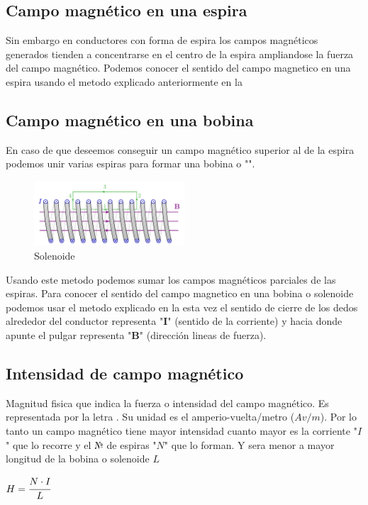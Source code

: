 \documentclass{report}
\begin{document}
  \subsection{Campo magnético en una espira}\label{ssec:espira}
Sin embargo en conductores con forma de espira los campos magnéticos generados tienden a concentrarse en el centro de la espira 
ampliandose la fuerza del campo magnético. Podemos conocer el sentido del campo magnetico en una espira usando el metodo
explicado anteriormente en la 


  \subsection{Campo magnético en una bobina }\label{ssec:bobina}
En caso de que deseemos conseguir un campo magnético superior al de la espira
podemos unir varias espiras para formar una bobina o "". {\hspace*{\fill}}
\begin{figure}
  \includegraphics[width=0.5\textwidth]{magnetic_field_solenoid.pdf} 
  \caption{Solenoide}
  \label{fig:solenoide}
\end{figure}
Usando este metodo podemos sumar los campos magnéticos parciales de las espiras. 
Para conocer el sentido del campo magnetico en una bobina o solenoide podemos usar el metodo explicado en la {}
esta vez el sentido de cierre de los dedos alrededor del conductor representa "\(\mathbf{I}\)" (sentido de la corriente) 
y hacia donde apunte el pulgar representa "\(\mathbf{B}\)" (dirección lineas de fuerza).\hfill
\newpage
\subsection{Intensidad de campo magnético}\label{ssec:intensidad_de_campo_magnético}
Magnitud fisica que indica la fuerza o intensidad del campo magnético. Es representada por la letra . Su unidad es el amperio-vuelta/metro (\(Av/m \)).\fspace{1em} 
Por lo tanto un campo magnético tiene mayor intensidad cuanto mayor es la corriente "\(I\)" que lo recorre y el № de espiras "\(N\)" que lo forman.
Y sera menor a mayor longitud de la bobina o solenoide \(L\)
\begin{center}
  \label{eq:intensidad_campo_magnetico}
  \begin{math}
    H = \cfrac{N \cdot I}{L}
  \end{math}
  
\end{center}
\end{document}
